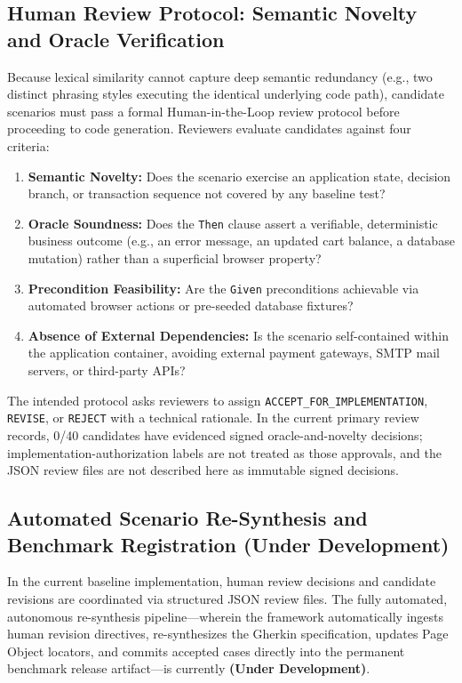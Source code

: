 \documentclass[pdflatex,sn-mathphys-num]{sn-jnl}
\begin{document}
\subsection{Human Review Protocol: Semantic Novelty and Oracle Verification}

Because lexical similarity cannot capture deep semantic redundancy (e.g., two distinct phrasing styles executing the identical underlying code path), candidate scenarios must pass a formal Human-in-the-Loop review protocol before proceeding to code generation. Reviewers evaluate candidates against four criteria:
\begin{enumerate}
    \item \textbf{Semantic Novelty:} Does the scenario exercise an application state, decision branch, or transaction sequence not covered by any baseline test?
    \item \textbf{Oracle Soundness:} Does the \texttt{Then} clause assert a verifiable, deterministic business outcome (e.g., an error message, an updated cart balance, a database mutation) rather than a superficial browser property?
    \item \textbf{Precondition Feasibility:} Are the \texttt{Given} preconditions achievable via automated browser actions or pre-seeded database fixtures?
    \item \textbf{Absence of External Dependencies:} Is the scenario self-contained within the application container, avoiding external payment gateways, SMTP mail servers, or third-party APIs?
\end{enumerate}
The intended protocol asks reviewers to assign \texttt{ACCEPT\_FOR\_IMPLEMENTATION}, \texttt{REVISE}, or \texttt{REJECT} with a technical rationale. In the current primary review records, 0/40 candidates have evidenced signed oracle-and-novelty decisions; implementation-authorization labels are not treated as those approvals, and the JSON review files are not described here as immutable signed decisions.

\subsection{Automated Scenario Re-Synthesis and Benchmark Registration (Under Development)}\label{subsec:registration-dev}

In the current baseline implementation, human review decisions and candidate revisions are coordinated via structured JSON review files. The fully automated, autonomous re-synthesis pipeline---wherein the framework automatically ingests human revision directives, re-synthesizes the Gherkin specification, updates Page Object locators, and commits accepted cases directly into the permanent benchmark release artifact---is currently \textbf{(Under Development)}. 
\end{document}

